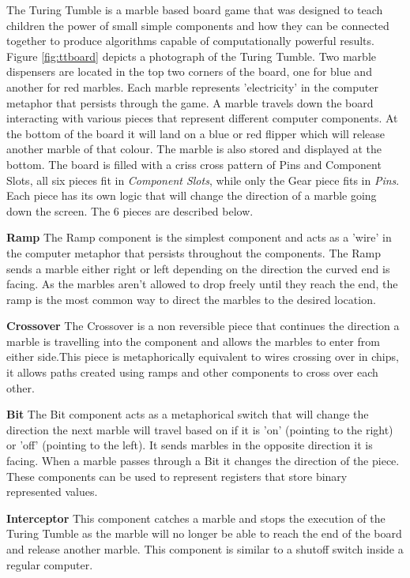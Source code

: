 \documentclass{l4proj}
\begin{document}
The Turing Tumble is a marble based board game that was designed to teach children the power of small simple components and how they can be connected together to produce algorithms capable of computationally powerful results. Figure \ref{fig:ttboard} depicts a photograph of the Turing Tumble. Two marble dispensers are located in the top two corners of the board, one for blue and another for red marbles. Each marble represents 'electricity' in the computer metaphor that persists through the game. A marble travels down the board interacting with various pieces that represent different computer components. At the bottom of the board it will land on a blue or red flipper which will release another marble of that colour. The marble is also stored and displayed at the bottom. The board is filled with a criss cross pattern of Pins and Component Slots, all six pieces fit in \emph{Component Slots}, while only the Gear piece fits in \emph{Pins}. Each piece has its own logic that will change the direction of a marble going down the screen. The 6 pieces are described below.

\textbf{Ramp}
The Ramp component is the simplest component and acts as a 'wire' in the computer metaphor that persists throughout the components. The Ramp sends a marble either right or left depending on the direction the curved end is facing. As the marbles aren't allowed to drop freely until they reach the end, the ramp is the most common way to direct the marbles to the desired location.

\textbf{Crossover}
The Crossover is a non reversible piece that continues the direction a marble is travelling into the component and allows the marbles to enter from either side.This piece is metaphorically equivalent to wires crossing over in chips, it allows paths created using ramps and other components to cross over each other.

\textbf{Bit}
The Bit component acts as a metaphorical switch that will change the direction the next marble will travel based on if it is 'on' (pointing to the right) or 'off' (pointing to the left). It sends marbles in the opposite direction it is facing. When a marble passes through a Bit it changes the direction of the piece. These components can be used to represent registers that store binary represented values.

\textbf{Interceptor}
This component catches a marble and stops the execution of the Turing Tumble as the marble will no longer be able to reach the end of the board and release another marble. This component is similar to a shutoff switch inside a regular computer. 
\end{document}
